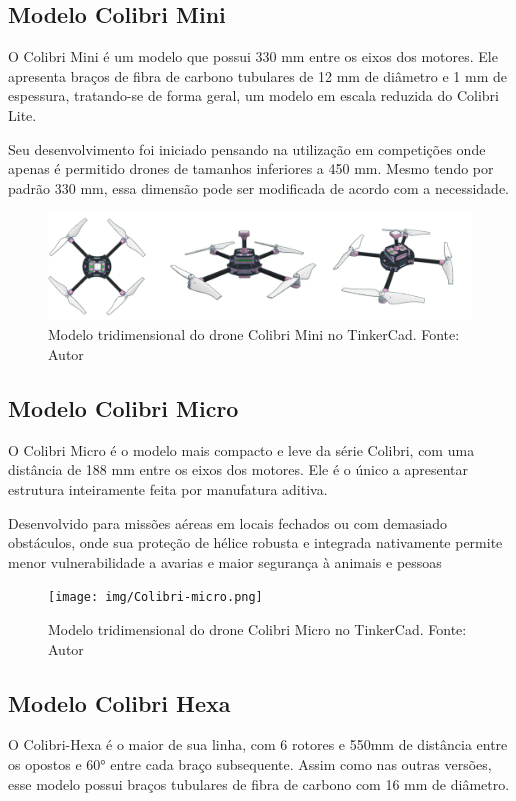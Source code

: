 \documentclass[conference]{IEEEtran}
\begin{document}
\subsection{Modelo Colibri Mini}
O Colibri Mini é um modelo que possui 330 mm entre os eixos dos motores. Ele apresenta braços de fibra de carbono tubulares de 12 mm de diâmetro e 1 mm de espessura, tratando-se de forma geral, um modelo em escala reduzida do Colibri Lite. 

Seu desenvolvimento foi iniciado pensando na utilização em competições onde apenas é permitido drones de tamanhos inferiores a 450 mm. Mesmo tendo por padrão 330 mm, essa dimensão pode ser modificada de acordo com a necessidade.

\begin{figure}[!htb]
    \centering
    \includegraphics[scale=0.14]{img/Colibri-mini.png} 
    \caption{Modelo tridimensional do drone Colibri Mini no TinkerCad. Fonte: Autor}
    \label{fig:ColibriMini}
\end{figure}

\subsection{Modelo Colibri Micro}

O Colibri Micro é o modelo mais compacto e leve da série Colibri, com uma distância de 188 mm entre os eixos dos motores. Ele é o único a apresentar estrutura inteiramente feita por manufatura aditiva.

Desenvolvido para missões aéreas em locais fechados ou com demasiado obstáculos, onde sua proteção de hélice robusta e integrada nativamente permite menor vulnerabilidade a avarias e maior segurança à animais e pessoas

\begin{figure}[!htb]
    \centering
    \texttt{[image: img/Colibri-micro.png]} 
    \caption{Modelo tridimensional do drone Colibri Micro no TinkerCad. Fonte: Autor}
    \label{fig:my_label}
\end{figure}

\subsection{Modelo Colibri Hexa}
O Colibri-Hexa é o maior de sua linha, com 6 rotores e 550mm de distância entre os opostos e 60° entre cada braço subsequente. Assim como nas outras versões, esse modelo possui braços tubulares de fibra de carbono com 16 mm de diâmetro.
\end{document}

